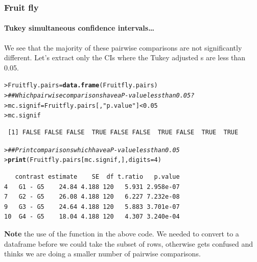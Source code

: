 \documentclass{beamer}\usepackage[]{graphicx}\usepackage[]{xcolor}
\makeatletter
\newcommand{\hlnum}[1]{\textcolor[rgb]{0.686,0.059,0.569}{#1}}%
\newcommand{\hlstr}[1]{\textcolor[rgb]{0.192,0.494,0.8}{#1}}%
\newcommand{\hlcom}[1]{\textcolor[rgb]{0.678,0.584,0.686}{\textit{#1}}}%
\newcommand{\hlopt}[1]{\textcolor[rgb]{0,0,0}{#1}}%
\newcommand{\hlstd}[1]{\textcolor[rgb]{0.345,0.345,0.345}{#1}}%
\newcommand{\hlkwb}[1]{\textcolor[rgb]{0.69,0.353,0.396}{#1}}%
\newcommand{\hlkwc}[1]{\textcolor[rgb]{0.333,0.667,0.333}{#1}}%
\newcommand{\hlkwd}[1]{\textcolor[rgb]{0.737,0.353,0.396}{\textbf{#1}}}%
\newenvironment{kframe}{%
 \def\at@end@of@kframe{}%
 \ifinner\ifhmode%
  \def\at@end@of@kframe{\end{minipage}}%
  \begin{minipage}{\columnwidth}%
 \fi\fi%
 \def\FrameCommand##1{\hskip\@totalleftmargin \hskip-\fboxsep
 \colorbox{shadecolor}{##1}\hskip-\fboxsep
     \hskip-\linewidth \hskip-\@totalleftmargin \hskip\columnwidth}%
 \MakeFramed {\advance\hsize-\width
   \@totalleftmargin\z@ \linewidth\hsize
   \@setminipage}}%
 {\par\unskip\endMakeFramed%
 \at@end@of@kframe}
\newenvironment{knitrout}{}{} %
\makeatother
\begin{document}
\begin{frame}[fragile]
\frametitle{Fruit fly}
\framesubtitle{Tukey simultaneous confidence intervals\ldots}

We see that the majority of these pairwise comparisons are not significantly different. Let's extract only the CIs where the Tukey adjusted \pval{}s are less than 0.05.

\medskip
  
\begin{knitrout}\scriptsize
{}\color{fgcolor}\begin{kframe}
\begin{alltt}
\hlstd{> }  \hlstd{Fruitfly.pairs}\hlkwb{=}\hlkwd{data.frame}\hlstd{(Fruitfly.pairs)}
\hlstd{> }  \hlcom{## Which pairwise comparisons have a P-value less than 0.05?}
\hlstd{> }  \hlstd{mc.signif} \hlkwb{=} \hlstd{Fruitfly.pairs[,}\hlstr{"p.value"}\hlstd{]} \hlopt{<} \hlnum{0.05}
\hlstd{> }  \hlstd{mc.signif}
\end{alltt}
\begin{verbatim}
 [1] FALSE FALSE FALSE  TRUE FALSE FALSE  TRUE FALSE  TRUE  TRUE
\end{verbatim}
\begin{alltt}
\hlstd{> }  \hlcom{## Print comparisons which have a P-value less than 0.05}
\hlstd{> }  \hlkwd{print}\hlstd{(Fruitfly.pairs[mc.signif, ],} \hlkwc{digits} \hlstd{=} \hlnum{4}\hlstd{)}
\end{alltt}
\begin{verbatim}
   contrast estimate    SE  df t.ratio   p.value
4   G1 - G5    24.84 4.188 120   5.931 2.958e-07
7   G2 - G5    26.08 4.188 120   6.227 7.232e-08
9   G3 - G5    24.64 4.188 120   5.883 3.701e-07
10  G4 - G5    18.04 4.188 120   4.307 3.240e-04
\end{verbatim}
\end{kframe}
\end{knitrout}

{\bf Note} the use of the  function in the above code. We needed to convert  to a dataframe before we could take the subset of rows, otherwise  gets confused and thinks we are doing a smaller number of pairwise comparisons. 

\end{frame}
  
\end{document}
